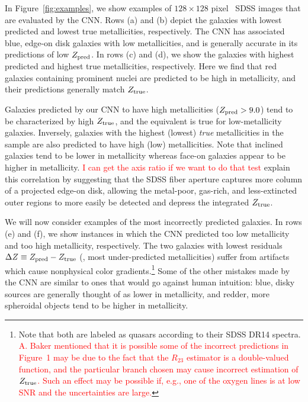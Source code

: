 \documentclass[fleqn,usenatbib]{mnras}
\newcommand{\editorial}[1]{\textcolor{red}{#1}}
\begin{document}
In Figure~\ref{fig:examples}, we show examples of $128 \times 128$ pixel \sdssi\sdssr\sdssg\ SDSS images that are evaluated by the CNN. Rows (a) and (b) depict the galaxies with lowest predicted and lowest true metallicities, respectively. The CNN has associated blue, edge-on disk galaxies with low metallicities, and is generally accurate in its predictions of low $Z_{\rm pred}$. In rows (c) and (d), we show the galaxies with highest predicted and highest true metallicities, respectively. Here we find that red galaxies containing prominent nuclei are predicted to be high in metallicity, and their predictions generally match $Z_{\rm true}$.

Galaxies predicted by our CNN to have high metallicities ($Z_{\rm pred} > 9.0$) tend to be characterized by high $Z_{\rm true}$, and the equivalent is true for low-metallicity galaxies. Inversely, galaxies with the highest (lowest) \textit{true} metallicities in the sample are also predicted to have high (low) metallicities. Note that inclined galaxies tend to be lower in metallicity whereas face-on galaxies appear to be higher in metallicity. \editorial{I can get the axis ratio if we want to do that test} \cite{Tremonti2004} explain this correlation by suggesting that the SDSS fiber aperture captures more column of a projected edge-on disk, allowing the metal-poor, gas-rich, and less-extincted outer regions to more easily be detected and depress the integrated $Z_{\rm true}$.

We will now consider examples of the most incorrectly predicted galaxies. In rows (e) and (f), we show instances in which the CNN predicted too low metallicity and too high metallicity, respectively. The two galaxies with lowest residuals $\Delta Z \equiv Z_{\rm pred} - Z_{\rm true}$ (\ie, most under-predicted metallicities) suffer from artifacts which cause nonphysical color gradients.\footnote{Note that both are labeled as quasars according to their SDSS DR14 spectra. \editorial{A. Baker mentioned that it is possible some of the incorrect predictions in Figure~1 may be due to the fact that the $R_{23}$ estimator is a double-valued function, and the particular branch chosen may cause incorrect estimation of $Z_{\rm true}$. Such an effect may be possible if, e.g., one of the oxygen lines is at low SNR and the uncertainties are large.}} Some of the other mistakes made by the CNN are similar to ones that would go against human intuition: blue, disky sources are generally thought of as lower in metallicity, and redder, more spheroidal objects tend to be higher in metallicity.
\end{document}
